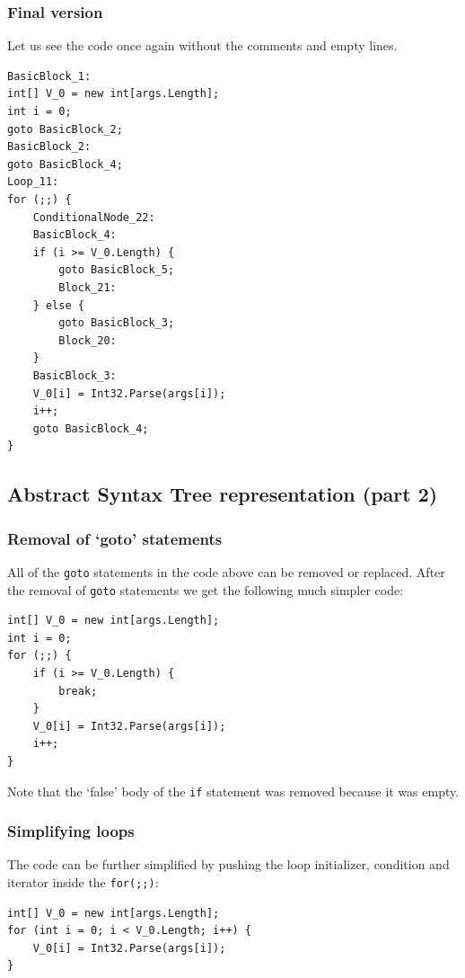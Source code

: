 \documentclass[12pt,twoside,notitlepage]{report}
\begin{document}
\subsubsection{Final version}

Let us see the code once again without the comments and empty lines.

\begin{verbatim}
BasicBlock_1:
int[] V_0 = new int[args.Length];
int i = 0;
goto BasicBlock_2;
BasicBlock_2:
goto BasicBlock_4;
Loop_11:
for (;;) {
    ConditionalNode_22:
    BasicBlock_4:
    if (i >= V_0.Length) {
        goto BasicBlock_5;
        Block_21:
    } else {
        goto BasicBlock_3;
        Block_20:
    }
    BasicBlock_3:
    V_0[i] = Int32.Parse(args[i]);
    i++;
    goto BasicBlock_4;
}
\end{verbatim}

\newpage
\subsection{Abstract Syntax Tree representation (part 2)}
\subsubsection{Removal of `goto' statements}

All of the \verb|goto| statements in the code above can be 
removed or replaced.  After the removal of \verb|goto| statements
we get the following much simpler code:

\begin{verbatim}
int[] V_0 = new int[args.Length];
int i = 0;
for (;;) {
    if (i >= V_0.Length) {
        break;
    }
    V_0[i] = Int32.Parse(args[i]);
    i++;
}
\end{verbatim}

Note that the `false' body of the \verb|if| statement was removed
because it was empty.

\subsubsection{Simplifying loops}

The code can be further simplified by pushing the loop initializer,
condition and iterator inside the \verb|for(;;)|:

\begin{verbatim}
int[] V_0 = new int[args.Length];
for (int i = 0; i < V_0.Length; i++) {
    V_0[i] = Int32.Parse(args[i]);
}
\end{verbatim}
\end{document}
